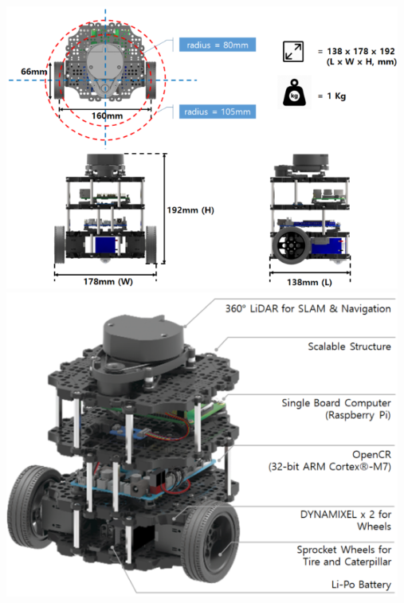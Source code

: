 \documentclass[10pt,a4paper,printanswers]{upmc}
\begin{document}
\begin{center}
  \includegraphics[width=13cm]{figures/turtlebot3_dimension1.png}\\
  \vspace{1cm}
  \includegraphics[width=13cm]{figures/turtlebot3_burger_components.png}
\end{center}

\newpage
\end{document}
